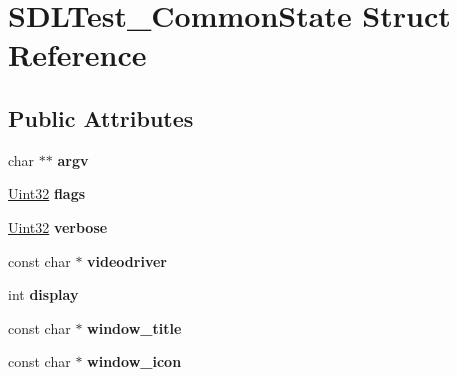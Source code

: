 \hypertarget{struct_s_d_l_test___common_state}{}\section{S\+D\+L\+Test\+\_\+\+Common\+State Struct Reference}
\label{struct_s_d_l_test___common_state}
\subsection*{Public Attributes}
\begin{DoxyCompactItemize}
\item 
\mbox{\label{struct_s_d_l_test___common_state_a6db840410b86ab7c6807763fd8bcb081}} 
char $\ast$$\ast$ {\bfseries argv}
\item 
\mbox{\label{struct_s_d_l_test___common_state_a97272d03558f1f74e579ec8a5cdabc5e}} 
\hyperlink{_s_d_l__stdinc_8h_add440eff171ea5f55cb00c4a9ab8672d}{Uint32} {\bfseries flags}
\item 
\mbox{\label{struct_s_d_l_test___common_state_aad4b8ebf6277cd9d3608d2e1b48e4678}} 
\hyperlink{_s_d_l__stdinc_8h_add440eff171ea5f55cb00c4a9ab8672d}{Uint32} {\bfseries verbose}
\item 
\mbox{\label{struct_s_d_l_test___common_state_ab3face917946465c60dc0f38f179534d}} 
const char $\ast$ {\bfseries videodriver}
\item 
\mbox{\label{struct_s_d_l_test___common_state_addb3de8e2b278deed8d2309bafd30758}} 
int {\bfseries display}
\item 
\mbox{\label{struct_s_d_l_test___common_state_a86640ebac0afe0c504c3c324d84dcc37}} 
const char $\ast$ {\bfseries window\+\_\+title}
\item 
\mbox{\label{struct_s_d_l_test___common_state_ac9e981b2b60a59f995153c74242d9d43}} 
const char $\ast$ {\bfseries window\+\_\+icon}
\item 
\mbox{\label{struct_s_d_l_test___common_state_a9e38339b34b483087ff8d52d44a80809}} 
$$
\end{DoxyCompactItemize}

